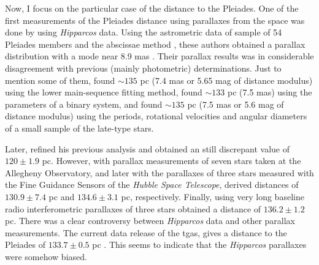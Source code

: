 Now, I focus on the particular case of the distance to the Pleiades. One of the first measurements of the Pleiades distance using parallaxes from the space was done by \citet{1997ESASP.402..689V} using \emph{Hipparcos} data. Using the astrometric data of sample of 54 Pleiades members and the abscissae method \citep{1997ESASP.402..203V}, these authors obtained a parallax distribution with a mode near 8.9 mas \cite[113 pc, see Figure 2 of][]{1997ESASP.402..689V}. Their parallax results was in considerable disagreement with previous (mainly photometric) determinations. Just to mention some of them, \citet{1986PASP...98..755E} found $\sim135$ pc (7.4 mas or 5.65 mag of distance modulus) using the lower main-sequence fitting method, \citet{1995A&A...293..360G} found $\sim133$ pc (7.5 mas) using the parameters of a binary system, and  \citet{1994MNRAS.268..181O} found $\sim135$ pc (7.5 mas or 5.6 mag of distance modulus) using the periods, rotational velocities and angular diameters of a small sample of the late-type stars. 

Later,  \citep{2009A&A...497..209V} refined his previous analysis and obtained an still discrepant value of $120\pm1.9$ pc. However, \citet{2000ApJ...533..938G} with parallax measurements of seven stars taken at the Allegheny Observatory, and later \citet{2005AJ....129.1616S} with the parallaxes of three stars measured with the Fine Guidance Sensors of the \emph{Hubble Space Telescope}, derived distances of $130.9\pm7.4$ pc and $134.6\pm3.1$ pc, respectively. Finally, \citet{2014Sci...345.1029M} using very long baseline radio interferometric parallaxes of three stars obtained a distance of $136.2\pm1.2$ pc. There was a clear controversy between \emph{Hipparcos} data and other parallax measurements. The current data release of the \gls{tgas}, gives a distance to the Pleiades of $133.7\pm0.5$ pc \cite[from a parallax of $7.48\pm0.03$ mas][]{2017A&A...601A..19G}. This seems to indicate that the \emph{Hipparcos} parallaxes were somehow biased.


